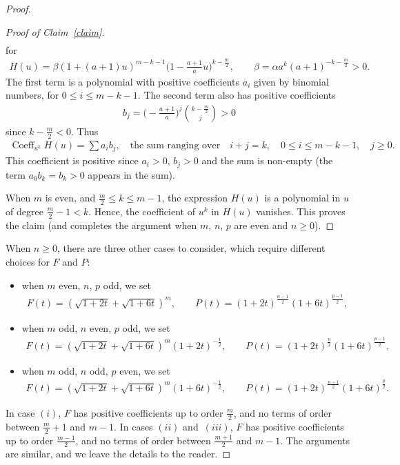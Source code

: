 \documentclass[pdftex]{sigma}
\numberwithin{equation}{section}
\begin{document}
\begin{proof}
\begin{proof}[Proof of Claim~\ref{claim}]
\begin{gather*}
\end{gather*}
for
\begin{gather*}
H(u)=\beta (1+(a+1)u)^{m-k-1} \biggl(1-\frac{a+1}{a}u\biggr)^{k-\frac{m}{2}}, \qquad \beta=\alpha a^{k} (a+1)^{-k-\frac{m}{2}}>0.
\end{gather*}
The first term is a polynomial with positive coefficients $a_i$ given by binomial numbers, for $0\leq i\leq m-k-1$. The second term also has positive coefficients
\begin{gather*}
b_j=\biggl(-\frac{a+1}{a}\biggr)^j\binom{k-\frac{m}{2}}{j}>0
\end{gather*}
since $k-\frac{m}{2}<0$. Thus
\begin{gather*}
\operatorname{Coeff}_{u^k} H(u)=\!\sum a_i b_j,\quad \text{the sum ranging over}\!\quad i+j=k, \quad 0\leq i\leq m-k-1, \quad j\geq 0.
\end{gather*}
This coefficient is positive since $a_i>0$, $b_j> 0$ and the sum is non-empty (the term $a_0b_k=b_k>0$ appears in the sum).

When $m$ is even, and $\frac{m}{2}\leq k\leq m-1$, the expression $H(u)$ is a polynomial in $u$ of degree $\frac{m}{2}-1<k$. Hence, the coefficient of $u^k$ in $H(u)$ vanishes.
This proves the claim (and completes the argument when $m$, $n$, $p$ are even and $n\geq 0$).
\end{proof}

When $n\geq 0$, there are three other cases to consider, which require different choices for $F$ and $P$:
\begin{itemize}\itemsep=0pt
\item [$(i)$] when $m$ even, $n$, $p$ odd, we set
\begin{gather*}
F(t)=\left(\sqrt{1+2t}+\sqrt{1+6t}\right)^m, \qquad
P(t)=(1+2t)^{\frac{n-1}{2}} (1+6t)^{\frac{p-1}{2}},
\end{gather*}
\item [$(ii)$] when $m$ odd, $n$ even, $p$ odd, we set
\begin{gather*}
F(t)=\left(\sqrt{1+2t}+\sqrt{1+6t}\right)^m {(1+2t)}^{-\frac{1}{2}}, \qquad
P(t)=(1+2t)^{\frac{n}{2}} (1+6t)^{\frac{p-1}{2}},
\end{gather*}
\item [$(iii)$] when $m$ odd, $n$ odd, $p$ even, we set
\begin{gather*}
F(t)=\left(\sqrt{1+2t}+\sqrt{1+6t}\right)^m (1+6t)^{-\frac{1}{2}}, \qquad
P(t)=(1+2t)^{\frac{n-1}{2}} (1+6t)^{\frac{p}{2}}.
\end{gather*}
\end{itemize}
In case $(i)$, $F$ has positive coefficients up to order $\frac{m}{2}$, and no terms of order between $\frac{m}{2}+1$ and $m-1$.
In cases $(ii)$ and~$(iii)$, $F$ has positive coefficients up to order $\frac{m-1}{2}$, and no terms of order between $\frac{m+1}{2}$ and $m-1$. The arguments are similar, and we leave the details to the reader.


\end{proof}
\end{document}
